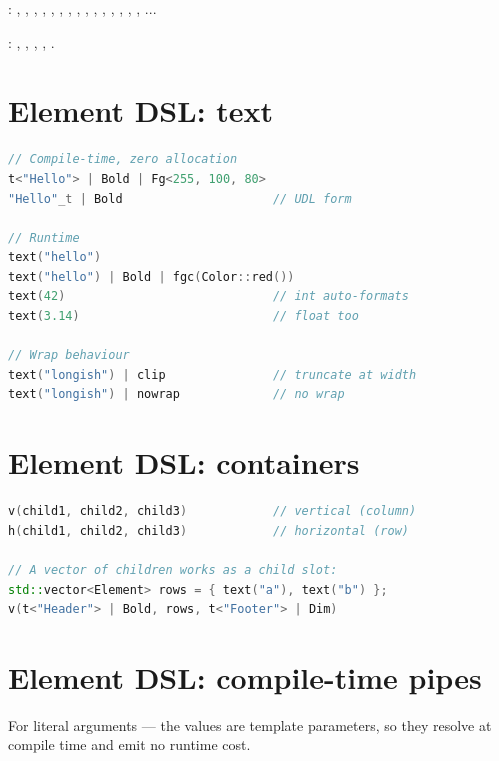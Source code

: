 \noindent {}: , ,
, , , ,
, , , ,
, , ,
, , ...

\noindent {}: , ,
, , .

\section{Element DSL: text}

\begin{lstlisting}[language=C++]
// Compile-time, zero allocation
t<"Hello"> | Bold | Fg<255, 100, 80>
"Hello"_t | Bold                     // UDL form

// Runtime
text("hello")
text("hello") | Bold | fgc(Color::red())
text(42)                             // int auto-formats
text(3.14)                           // float too

// Wrap behaviour
text("longish") | clip               // truncate at width
text("longish") | nowrap             // no wrap
\end{lstlisting}

\section{Element DSL: containers}

\begin{lstlisting}[language=C++]
v(child1, child2, child3)            // vertical (column)
h(child1, child2, child3)            // horizontal (row)

// A vector of children works as a child slot:
std::vector<Element> rows = { text("a"), text("b") };
v(t<"Header"> | Bold, rows, t<"Footer"> | Dim)
\end{lstlisting}

\section{Element DSL: compile-time pipes}

For literal arguments — the values are template parameters,
so they resolve at compile time and emit no runtime cost.

